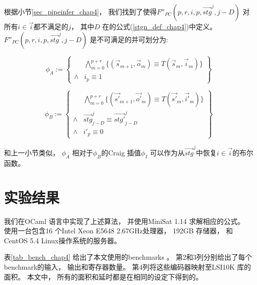 根据小节\ref{sec_pipeinfer_chap4}，
我们找到了使得$F''_{PC}(p,r,i,p,\vec{stg}^{j},j-D)$ 对所有$i\in \vec{i}$都不满足的$j$，
其中$D$ 在的公式(\ref{stgn_def_chap4})中定义。
$F''_{PC}(p,r,i,p,\vec{stg}^{j},j-D)$ 是不可满足的并可划分为:

\begin{equation}
\phi_A:=
\left\{
\begin{array}{cc}
&\bigwedge_{m=0}^{p+r}
\{
(\vec{s}_{m+1},\vec{o}_m)\equiv T(\vec{s}_m,\vec{i}_m)
\}
\\
\wedge& i_{p}\equiv 1
\end{array}
\right\}
\end{equation}

\begin{equation}
\phi_B:=
\left\{
\begin{array}{cc}
&\bigwedge_{m=0}^{p+r}
\{
(\vec{s'}_{m+1},\vec{o'}_m)\equiv T(\vec{s'}_m,\vec{i'}_m)
\}
\\
\wedge&\vec{stg}^j_{j-D}\equiv \vec{stg'}^j_{j-D} \\
\wedge& i'_{p}\equiv 0
\end{array}
\right\}
\end{equation}

和上一小节类似，
$\phi_A$ 相对于$\phi_B$的Craig 插值$\phi_I$
可以作为从$\vec{stg}^j$中恢复$i\in\vec{i}$的布尔函数。



\section{实验结果}\label{sec_exp_chap4}
我们在OCaml 语言中实现了上述算法，
并使用MiniSat 1.14 \cite{EXTSAT}求解相应的公式。
使用一台包含16 个Intel Xeon E5648 2.67GHz处理器，
192GB 存储器， 和CentOS 5.4 Linux操作系统的服务器。

表\ref{tab_bench_chap4} 给出了本文使用的benchmarks 。
第2和3列分别给出了每个benchmark的输入， 输出和寄存器数量。
第4列将这些编码器映射至LSI10K 库的面积。
本文中，
所有的面积和延时都是在相同的设定下得到的。



